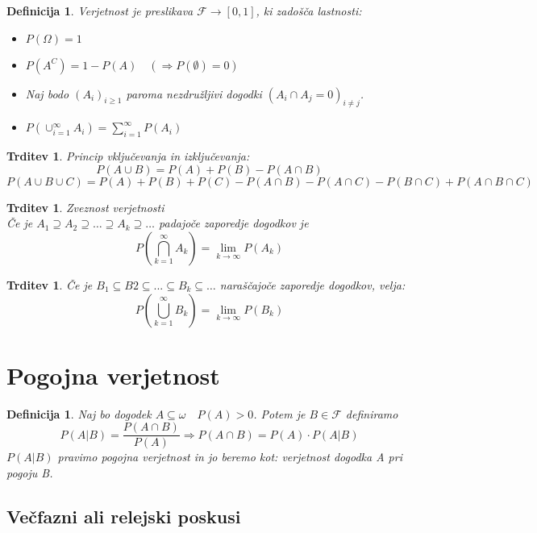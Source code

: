 \documentclass[11pt]{article}
\newtheorem{Trditev}[Izrek]{{\sc Trditev}}
\newtheorem{Definicija}[Izrek]{{\sc Definicija}}
\begin{document}
	\begin{Definicija}
		Verjetnost je preslikava $\mathcal{F}\to [0,1]$, ki zadošča lastnosti:
		\begin{itemize}
			\item
			$P(\Omega) = 1$
			\item
			$P(A^C) = 1 - P(A) \quad (\Rightarrow P(\emptyset) = 0)$
			\item
			Naj bodo $(A_i)_{i \ge 1} $ paroma nezdružljivi dogodki $(A_i \cap A_j = 0)_{i\neq j}$.
			\item
			$P(\cup_{i =1}^{\infty}A_i) = \sum_{i = 1}^{\infty}P(A_i)$
		\end{itemize}
	\end{Definicija}
	
	\begin{Trditev}
		Princip vključevanja in izključevanja:
		$$P(A\cup B  ) = P(A) + P(B) - P(A \cap B)$$
		$$P(A \cup B \cup C) = P(A) + P(B) + P(C) - P(A \cap B) - P(A \cap C ) - P(B \cap C) + P(A\cap B \cap C)$$
	\end{Trditev}
	
	\begin{Trditev}
		Zveznost verjetnosti
		\\
		Če je $A_1 \supseteq A_2 \supseteq \dots \supseteq A_k \supseteq \dots $ padajoče zaporedje dogodkov je 
		\[
		P(\bigcap_{k=1}^{\infty} A_k) = \lim\limits_{k \to \infty}{P(A_k)}
		\]
	\end{Trditev}
	\begin{Trditev}
		Če je $ B_1 \subseteq B2 \subseteq ... \subseteq B_k \subseteq \dots$ naraščajoče zaporedje dogodkov, velja:
		\[
		P(\bigcup_{k=1}^{\infty} B_k) = \lim\limits_{k \to \infty}{P(B_k)}
		\]
	\end{Trditev}
	\section{Pogojna verjetnost}
	\begin{Definicija}
		Naj bo dogodek $A \subseteq \omega \quad P(A) > 0$.
		Potem je $B\in \mathcal{F}$ definiramo $$P(A|B) = \frac{P(A \cap B)}{P(A)} \Rightarrow P(A\cap B) = P(A) \cdot P(A|B)$$
		$P(A|B)$ pravimo pogojna verjetnost in jo beremo kot: verjetnost dogodka A pri pogoju B.
	\end{Definicija}
	
	\subsection{Večfazni ali relejski poskusi}
\end{document}
